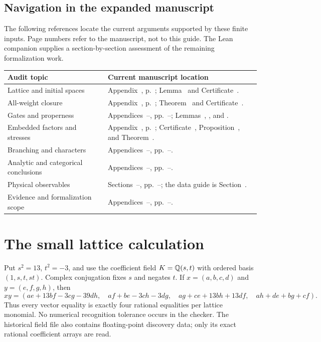 \subsection{Navigation in the expanded manuscript}
The following references locate the current arguments supported by
these finite inputs. Page numbers refer to the manuscript, not to this
guide. The Lean companion supplies a section-by-section assessment of
the remaining formalization work.
\begin{longtable}{@{}P{.28\linewidth}P{.60\linewidth}@{}}
\toprule Audit topic & Current manuscript location\\\midrule
\endhead
Lattice and initial spaces & Appendix~,
p.~; Lemma~ and
Certificate~.\\
All-weight closure & Appendix~,
p.~; Theorem~ and
Certificate~.\\
Gates and properness & Appendices~--,
pp.~--;
Lemmas~, , and .\\
Embedded factors and stresses & Appendix~,
p.~; Certificate~,
Proposition~, and
Theorem~.\\
Branching and characters & Appendices~--,
pp.~--.\\
Analytic and categorical conclusions & Appendices~--,
pp.~--.\\
Physical observables & Sections~--,
pp.~--;
the data guide is Section~.\\
Evidence and formalization scope & Appendices~--,
pp.~--.\\
\bottomrule
\end{longtable}

\section{The small lattice calculation}
Put $s^2=13$, $t^2=-3$, and use the coefficient field
$K=\mathbb Q(s,t)$ with ordered basis $(1,s,t,st)$. Complex conjugation fixes
$s$ and negates $t$. If $x=(a,b,c,d)$ and $y=(e,f,g,h)$, then
\[
xy=(ae+13bf-3cg-39dh,\quad af+be-3ch-3dg,
\quad ag+ce+13bh+13df,\quad ah+de+bg+cf).
\]
Thus every vector equality is exactly four rational equalities per
lattice monomial. No numerical recognition tolerance occurs in the
checker. The historical field file also contains floating-point discovery
data; only its exact rational coefficient arrays are read.

